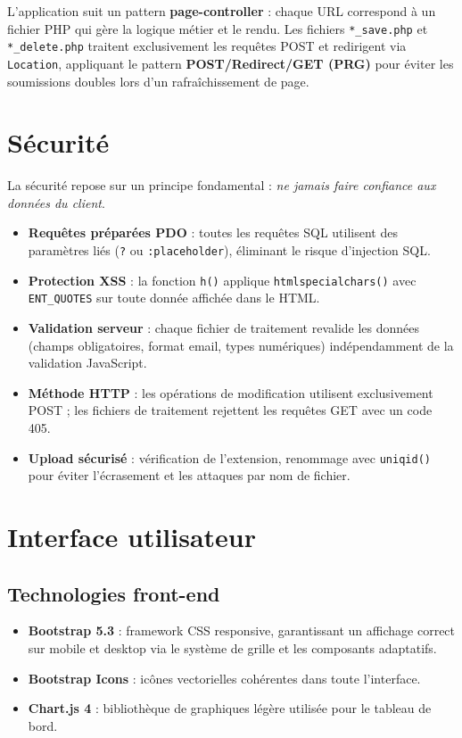 \documentclass[11pt,a4paper]{article}
\begin{document}
L'application suit un pattern \textbf{page-controller} : chaque URL correspond \`a un fichier PHP qui g\`ere la logique m\'etier et le rendu. Les fichiers \texttt{*\_save.php} et \texttt{*\_delete.php} traitent exclusivement les requ\^etes POST et redirigent via \texttt{Location}, appliquant le pattern \textbf{POST/Redirect/GET (PRG)} pour \'eviter les soumissions doubles lors d'un rafra\^ichissement de page.


\section{S\'ecurit\'e}

La s\'ecurit\'e repose sur un principe fondamental : \textit{ne jamais faire confiance aux donn\'ees du client}.

\begin{itemize}
  \item \textbf{Requ\^etes pr\'epar\'ees PDO} : toutes les requ\^etes SQL utilisent des param\`etres li\'es (\texttt{?} ou \texttt{:placeholder}), \'eliminant le risque d'injection SQL.
  \item \textbf{Protection XSS} : la fonction \texttt{h()} applique \texttt{htmlspecialchars()} avec \texttt{ENT\_QUOTES} sur toute donn\'ee affich\'ee dans le HTML.
  \item \textbf{Validation serveur} : chaque fichier de traitement revalide les donn\'ees (champs obligatoires, format email, types num\'eriques) ind\'ependamment de la validation JavaScript.
  \item \textbf{M\'ethode HTTP} : les op\'erations de modification utilisent exclusivement POST ; les fichiers de traitement rejettent les requ\^etes GET avec un code 405.
  \item \textbf{Upload s\'ecuris\'e} : v\'erification de l'extension, renommage avec \texttt{uniqid()} pour \'eviter l'\'ecrasement et les attaques par nom de fichier.
\end{itemize}


\section{Interface utilisateur}

\subsection{Technologies front-end}

\begin{itemize}
  \item \textbf{Bootstrap 5.3} : framework CSS responsive, garantissant un affichage correct sur mobile et desktop via le syst\`eme de grille et les composants adaptatifs.
  \item \textbf{Bootstrap Icons} : ic\^ones vectorielles coh\'erentes dans toute l'interface.
  \item \textbf{Chart.js 4} : biblioth\`eque de graphiques l\'eg\`ere utilis\'ee pour le tableau de bord.
\end{itemize}
\end{document}
